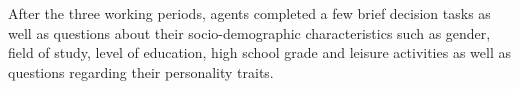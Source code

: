 After the three working periods, agents completed a few brief decision tasks as well as
questions 
about their  socio-demographic characteristics such as  gender, field of study, 
level of education, high school grade and leisure activities as well as questions regarding 
their personality traits.







